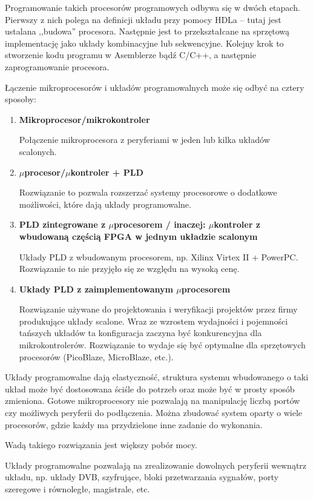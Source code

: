 Programowanie takich procesorów programowych odbywa się w dwóch etapach. Pierwszy z nich polega na definicji układu przy pomocy HDLa -- tutaj jest ustalana ,,budowa'' procesora. Następnie jest to przekształcane na sprzętową implementację jako układy kombinacyjne lub sekwencyjne. Kolejny krok to stworzenie kodu programu w Asemblerze bądź C/C++, a następnie zaprogramowanie procesora.

Łączenie mikroprocesorów i układów programowalnych może się odbyć na cztery sposoby:
\begin{enumerate}
\item \textbf{Mikroprocesor/mikrokontroler}

Połączenie mikroprocesora z peryferiami w jeden lub kilka układów scalonych.
\item \textbf{$\mu$procesor/$\mu$kontroler + PLD}

Rozwiązanie to pozwala rozszerzać systemy procesorowe o dodatkowe możliwości, które dają układy programowalne.
\item \textbf{PLD zintegrowane z $\mu$procesorem / inaczej: $\mu$kontroler z wbudowaną częścią FPGA w jednym układzie scalonym}

Układy PLD z wbudowanym procesorem, np. Xilinx Virtex II + PowerPC. Rozwiązanie to nie przyjęło się ze względu na wysoką cenę.

\item \textbf{Układy PLD z zaimplementowanym $\mu$procesorem}

Rozwiązanie używane do projektowania i weryfikacji projektów przez firmy produkujące układy scalone. Wraz ze wzrostem wydajności i pojemności tańszych układów ta konfiguracja zaczyna być konkurencyjna dla mikrokontrolerów. Rozwiązanie to wydaje się być optymalne dla sprzętowych procesorów (PicoBlaze, MicroBlaze, etc.).
\end{enumerate}

Układy programowalne dają elastyczność, struktura systemu wbudowanego o taki układ może być dostosowana ściśle do potrzeb oraz może być w prosty sposób zmieniona. Gotowe mikroprocesory nie pozwalają na manipulację liczbą portów czy możliwych peryferii do podłączenia. Można zbudować system oparty o wiele procesorów, gdzie każdy ma przydzielone inne zadanie do wykonania. 

Wadą takiego rozwiązania jest większy pobór mocy.

Układy programowalne pozwalają na zrealizowanie dowolnych peryferii wewnątrz układu, np. układy DVB, szyfrujące, bloki przetwarzania sygnałów, porty szeregowe i równoległe, magistrale, etc.
